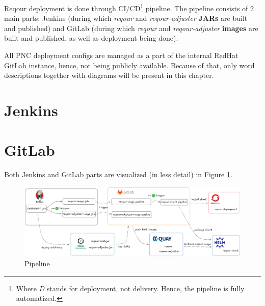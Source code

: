 \documentclass[../main.tex]{subfiles}
\begin{document}
Reqour deployment is done through CI/CD\footnote{Where \textit{D} stands for deployment, not delivery. Hence, the pipeline is fully automatized.} pipeline. The pipeline consists of 2 main parts: Jenkins (during which \textit{reqour} and \textit{reqour-adjuster} \textbf{JARs} are built and published) and GitLab (during which \textit{reqour} and \textit{reqour-adjuster} \textbf{images} are built and published, as well as deployment being done).

All PNC deployment configs are managed as a part of the internal RedHat GitLab instance, hence, not being publicly available. Because of that, only word descriptions together with diagrams will be present in this chapter.

\section{Jenkins}


\section{GitLab}


Both Jenkins and GitLab parts are visualized (in less detail) in Figure \ref{fig:pipeline}.

\begin{figure}
  \begin{center}
    \includegraphics[width=\textwidth]{images/pipeline.png}
  \end{center}
  \caption{Pipeline}
  \label{fig:pipeline}
\end{figure}
\end{document}

